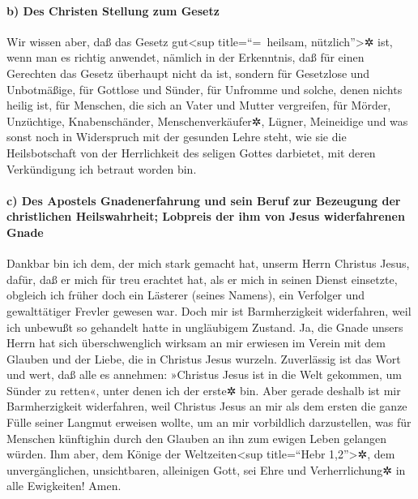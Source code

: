 \hypertarget{b-des-christen-stellung-zum-gesetz}{%
\paragraph{b) Des Christen Stellung zum
Gesetz}\label{b-des-christen-stellung-zum-gesetz}}

 Wir wissen aber, daß das Gesetz gut\textless sup
title=``=~heilsam, nützlich''\textgreater✲ ist, wenn man es richtig
anwendet,  nämlich in der Erkenntnis, daß für einen
Gerechten das Gesetz überhaupt nicht da ist, sondern für Gesetzlose und
Unbotmäßige, für Gottlose und Sünder, für Unfromme und solche, denen
nichts heilig ist, für Menschen, die sich an Vater und Mutter
vergreifen, für Mörder,  Unzüchtige, Knabenschänder,
Menschenverkäufer✲, Lügner, Meineidige und was sonst noch in Widerspruch
mit der gesunden Lehre steht,  wie sie die Heilsbotschaft
von der Herrlichkeit des seligen Gottes darbietet, mit deren
Verkündigung ich betraut worden bin.

\hypertarget{c-des-apostels-gnadenerfahrung-und-sein-beruf-zur-bezeugung-der-christlichen-heilswahrheit-lobpreis-der-ihm-von-jesus-widerfahrenen-gnade}{%
\paragraph{c) Des Apostels Gnadenerfahrung und sein Beruf zur Bezeugung
der christlichen Heilswahrheit; Lobpreis der ihm von Jesus widerfahrenen
Gnade}\label{c-des-apostels-gnadenerfahrung-und-sein-beruf-zur-bezeugung-der-christlichen-heilswahrheit-lobpreis-der-ihm-von-jesus-widerfahrenen-gnade}}

 Dankbar bin ich dem, der mich stark gemacht hat, unserm
Herrn Christus Jesus, dafür, daß er mich für treu erachtet hat, als er
mich in seinen Dienst einsetzte,  obgleich ich früher
doch ein Lästerer (seines Namens), ein Verfolger und gewalttätiger
Frevler gewesen war. Doch mir ist Barmherzigkeit widerfahren, weil ich
unbewußt so gehandelt hatte in ungläubigem Zustand.  Ja,
die Gnade unsers Herrn hat sich überschwenglich wirksam an mir erwiesen
im Verein mit dem Glauben und der Liebe, die in Christus Jesus wurzeln.
 Zuverlässig ist das Wort und wert, daß alle es annehmen:
»Christus Jesus ist in die Welt gekommen, um Sünder zu retten«, unter
denen ich der erste✲ bin.  Aber gerade deshalb ist mir
Barmherzigkeit widerfahren, weil Christus Jesus an mir als dem ersten
die ganze Fülle seiner Langmut erweisen wollte, um an mir vorbildlich
darzustellen, was für Menschen künftighin durch den Glauben an ihn zum
ewigen Leben gelangen würden.  Ihm aber, dem Könige der
Weltzeiten\textless sup title=``Hebr 1,2''\textgreater✲, dem
unvergänglichen, unsichtbaren, alleinigen Gott, sei Ehre und
Verherrlichung✲ in alle Ewigkeiten! Amen.

